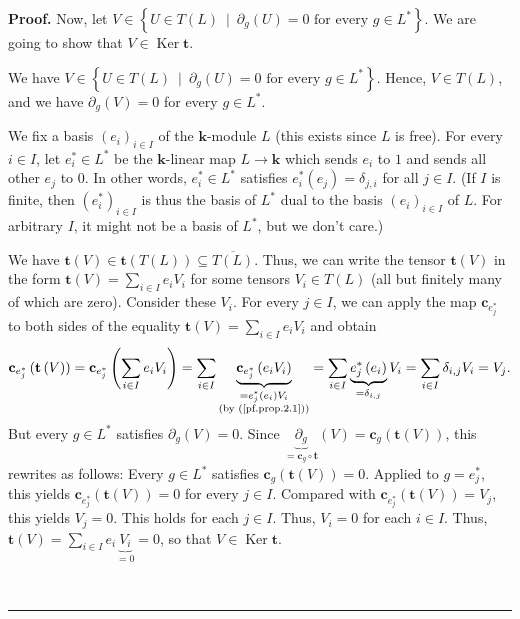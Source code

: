 \documentclass[numbers=enddot,12pt,final,onecolumn,notitlepage]{scrartcl}%
\theoremstyle{definition}
\newenvironment{proof}[1][Proof]{\noindent\textbf{#1.} }{\ \rule{0.5em}{0.5em}}
\let\sumnonlimits\sum
\renewcommand{\sum}{\sumnonlimits\limits}
\begin{document}
\begin{proof}
Now, let $V\in\left\{  U\in T\left(  L\right)  \ \mid\ \partial_{g}\left(
U\right)  =0\text{ for every }g\in L^{\ast}\right\}  $. We are going to show
that $V\in\operatorname*{Ker}\mathbf{t}$.

We have $V\in\left\{  U\in T\left(  L\right)  \ \mid\ \partial_{g}\left(
U\right)  =0\text{ for every }g\in L^{\ast}\right\}  $. Hence, $V\in T\left(
L\right)  $, and we have $\partial_{g}\left(  V\right)  =0$ for every $g\in
L^{\ast}$.

We fix a basis $\left(  e_{i}\right)  _{i\in I}$ of the $\mathbf{k}$-module
$L$ (this exists since $L$ is free). For every $i\in I$, let $e_{i}^{\ast}\in
L^{\ast}$ be the $\mathbf{k}$-linear map $L\rightarrow\mathbf{k}$ which sends
$e_{i}$ to $1$ and sends all other $e_{j}$ to $0$. In other words,
$e_{i}^{\ast}\in L^{\ast}$ satisfies $e_{i}^{\ast}\left(  e_{j}\right)
=\delta_{j,i}$ for all $j\in I$. (If $I$ is finite, then $\left(  e_{i}^{\ast
}\right)  _{i\in I}$ is thus the basis of $L^{\ast}$ dual to the basis
$\left(  e_{i}\right)  _{i\in I}$ of $L$. For arbitrary $I$, it might not be a
basis of $L^{\ast}$, but we don't care.)

We have $\mathbf{t}\left(  V\right)  \in\mathbf{t}\left(  T\left(  L\right)
\right)  \subseteq\overline{T\left(  L\right)  }$. Thus, we can write the
tensor $\mathbf{t}\left(  V\right)  $ in the form $\mathbf{t}\left(  V\right)
=\sum_{i\in I}e_{i}V_{i}$ for some tensors $V_{i}\in T\left(  L\right)  $ (all
but finitely many of which are zero). Consider these $V_{i}$. For every $j\in
I$, we can apply the map $\mathbf{c}_{e_{j}^{\ast}}$ to both sides of the
equality $\mathbf{t}\left(  V\right)  =\sum_{i\in I}e_{i}V_{i}$ and obtain%
\[
\mathbf{c}_{e_{j}^{\ast}}\left(  \mathbf{t}\left(  V\right)  \right)
=\mathbf{c}_{e_{j}^{\ast}}\left(  \sum_{i\in I}e_{i}V_{i}\right)  =\sum_{i\in
I}\underbrace{\mathbf{c}_{e_{j}^{\ast}}\left(  e_{i}V_{i}\right)
}_{\substack{=e_{j}^{\ast}\left(  e_{i}\right)  V_{i}\\\text{(by
(\ref{pf.prop.2.1}))}}}=\sum_{i\in I}\underbrace{e_{j}^{\ast}\left(
e_{i}\right)  }_{=\delta_{i,j}}V_{i}=\sum_{i\in I}\delta_{i,j}V_{i}=V_{j}.
\]
But every $g\in L^{\ast}$ satisfies $\partial_{g}\left(  V\right)  =0$. Since
$\underbrace{\partial_{g}}_{=\mathbf{c}_{g}\circ\mathbf{t}}\left(  V\right)
=\mathbf{c}_{g}\left(  \mathbf{t}\left(  V\right)  \right)  $, this rewrites
as follows: Every $g\in L^{\ast}$ satisfies $\mathbf{c}_{g}\left(
\mathbf{t}\left(  V\right)  \right)  =0$. Applied to $g=e_{j}^{\ast}$, this
yields $\mathbf{c}_{e_{j}^{\ast}}\left(  \mathbf{t}\left(  V\right)  \right)
=0$ for every $j\in I$. Compared with $\mathbf{c}_{e_{j}^{\ast}}\left(
\mathbf{t}\left(  V\right)  \right)  =V_{j}$, this yields $V_{j}=0$. This
holds for each $j\in I$. Thus, $V_{i}=0$ for each $i\in I$. Thus,
$\mathbf{t}\left(  V\right)  =\sum_{i\in I}e_{i}\underbrace{V_{i}}_{=0}=0$, so
that $V\in\operatorname*{Ker}\mathbf{t}$.


\end{proof}
\end{document}
